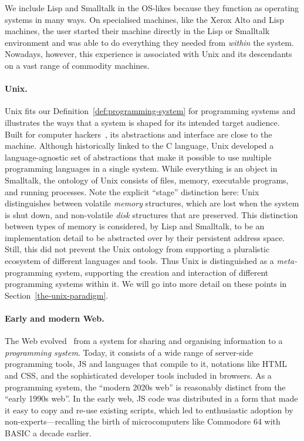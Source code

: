 \documentclass[ twoside,openright,titlepage,numbers=noenddot,headinclude,footinclude,cleardoublepage=empty,abstract=on,
                BCOR=5mm,paper=a4,fontsize=11pt
                ]{scrreprt}
\theoremstyle{definition}
\begin{document}
We include Lisp and Smalltalk in the OS-likes because they function as
operating systems in many ways. On specialised machines, like the Xerox
Alto and Lisp machines, the user started their machine directly in the
Lisp or Smalltalk environment and was able to do everything they needed
from \emph{within} the system. Nowadays, however, this experience is
associated with Unix and its descendants on a vast range of commodity
machines.

\paragraph{Unix.}

Unix fits our Definition~\ref{def:programming-system} for programming
systems and illustrates the ways that a system is shaped for its
intended target audience. Built for computer
hackers~\parencite{Hackers}, its abstractions and interface are close to
the machine. Although historically linked to the C language, Unix
developed a language-agnostic set of abstractions that make it possible
to use multiple programming languages in a single system. While
everything is an object in Smalltalk, the ontology of Unix consists of
files, memory, executable programs, and running processes. Note the
explicit ``stage'' distinction here: Unix distinguishes between volatile
\emph{memory} structures, which are lost when the system is shut down,
and non-volatile \emph{disk} structures that are preserved. This
distinction between types of memory is considered, by Lisp and
Smalltalk, to be an implementation detail to be abstracted over by their
persistent address space. Still, this did not prevent the Unix ontology
from supporting a pluralistic ecosystem of different languages and
tools. Thus Unix is distinguished as a \emph{meta-}programming system,
supporting the creation and interaction of different programming systems
within it. We will go into more detail on these points in
Section~\ref{the-unix-paradigm}.

\paragraph{Early and modern Web.}

The Web evolved~\parencite{DotCom} from a system for sharing and
organising information to a \emph{programming system}. Today, it
consists of a wide range of server-side programming tools, \ac{JS} and
languages that compile to it, notations like HTML and CSS, and the
sophisticated developer tools included in browsers. As a programming
system, the ``modern 2020s web'' is reasonably distinct from the ``early
1990s web''. In the early web, \ac{JS} code was distributed in a form
that made it easy to copy and re-use existing scripts, which led to
enthusiastic adoption by non-experts---recalling the birth of
microcomputers like Commodore 64 with BASIC a decade earlier.
\end{document}
